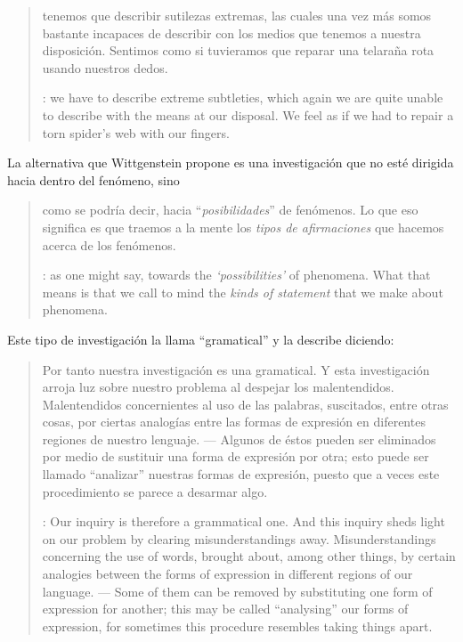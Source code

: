 \blockquote[{\cite[\S106]{wittgenstein1953phiinv}}: we have to describe extreme
subtleties, which again we are quite unable to describe with the means at our
disposal. We feel as if we had to repair a torn spider's web with our fingers.
]{tenemos que describir sutilezas extremas, las cuales una vez más somos
  bastante incapaces de describir con los medios que tenemos a nuestra
  disposición. Sentimos como si tuvieramos que reparar una telaraña rota usando
  nuestros dedos.}

La alternativa que Wittgenstein propone es una investigación que no esté
dirigida hacia dentro del fenómeno, sino
\blockquote[{\cite[\S90]{wittgenstein1953phiinv}}: as one might say, towards the
\emph{`possibilities'} of phenomena. What that means is that we call to mind the
\emph{kinds of statement} that we make about phenomena.]{como se podría decir,
  hacia \enquote{\emph{posibilidades}} de fenómenos. Lo que eso significa es que
  traemos a la mente los \emph{tipos de afirmaciones} que hacemos acerca de los
  fenómenos.}
Este tipo de investigación la llama \enquote{gramatical} y la describe diciendo:
\blockquote[{\cite[\S90]{wittgenstein1953phiinv}}: Our inquiry is therefore a
grammatical one. And this inquiry sheds light on our problem by clearing
misunderstandings away. Misunderstandings concerning the use of words, brought
about, among other things, by certain analogies between the forms of expression
in different regions of our language. --- Some of them can be removed by
substituting one form of expression for another; this may be called
\enquote{analysing} our forms of expression, for sometimes this procedure
resembles taking things apart. ]{Por tanto nuestra investigación es una
  gramatical. Y esta investigación arroja luz sobre nuestro problema al despejar
  los malentendidos. Malentendidos concernientes al uso de las palabras,
  suscitados, entre otras cosas, por ciertas analogías entre las formas de
  expresión en diferentes regiones de nuestro lenguaje. --- Algunos de éstos
  pueden ser eliminados por medio de sustituir una forma de expresión por otra;
  esto puede ser llamado \enquote{analizar} nuestras formas de expresión, puesto
  que a veces este procedimiento se parece a desarmar algo.}

